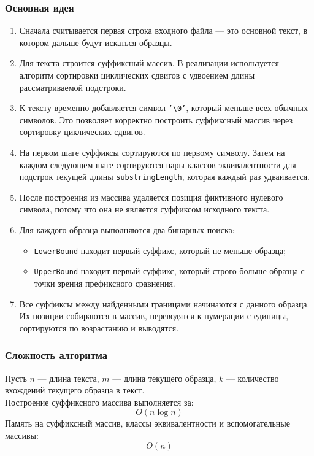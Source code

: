 \documentclass[12pt]{article}
\begin{document}
\subsubsection*{Основная идея}
\begin{enumerate}
\item Сначала считывается первая строка входного файла — это основной текст, в котором дальше будут искаться образцы.
\item Для текста строится суффиксный массив. В реализации используется алгоритм сортировки циклических сдвигов с удвоением длины рассматриваемой подстроки.
\item К тексту временно добавляется символ \texttt{'\textbackslash 0'}, который меньше всех обычных символов. Это позволяет корректно построить суффиксный массив через сортировку циклических сдвигов.
\item На первом шаге суффиксы сортируются по первому символу. Затем на каждом следующем шаге сортируются пары классов эквивалентности для подстрок текущей длины \texttt{substringLength}, которая каждый раз удваивается.
\item После построения из массива удаляется позиция фиктивного нулевого символа, потому что она не является суффиксом исходного текста.
\item Для каждого образца выполняются два бинарных поиска:
\begin{itemize}
    \item \texttt{LowerBound} находит первый суффикс, который не меньше образца;
    \item \texttt{UpperBound} находит первый суффикс, который строго больше образца с точки зрения префиксного сравнения.
\end{itemize}
\item Все суффиксы между найденными границами начинаются с данного образца. Их позиции собираются в массив, переводятся к нумерации с единицы, сортируются по возрастанию и выводятся.
\end{enumerate}

\subsubsection*{Сложность алгоритма}
Пусть $n$ — длина текста, $m$ — длина текущего образца, $k$ — количество вхождений текущего образца в текст. \\

Построение суффиксного массива выполняется за:
\[
O(n \log n)
\]
Память на суффиксный массив, классы эквивалентности и вспомогательные массивы:
\[
O(n)
\]
\end{document}
